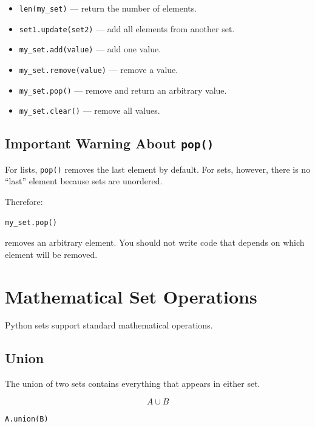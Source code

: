 \documentclass[11pt]{article}
\begin{document}
\begin{itemize}
    \item \verb|len(my_set)| --- return the number of elements.
    
    \item \verb|set1.update(set2)| --- add all elements from another set.
    
    \item \verb|my_set.add(value)| --- add one value.
    
    \item \verb|my_set.remove(value)| --- remove a value.
    
    \item \verb|my_set.pop()| --- remove and return an arbitrary value.
    
    \item \verb|my_set.clear()| --- remove all values.
\end{itemize}

\subsection{Important Warning About \texttt{pop()}}

For lists, \texttt{pop()} removes the last element by default. For sets, however, there is no ``last'' element because sets are unordered.

Therefore:

\begin{lstlisting}[language=Python]
my_set.pop()
\end{lstlisting}

removes an arbitrary element. You should not write code that depends on which element will be removed.

\section{Mathematical Set Operations}

Python sets support standard mathematical operations.

\subsection{Union}

The union of two sets contains everything that appears in either set.

\[
A \cup B
\]

\begin{lstlisting}[language=Python]
A.union(B)
\end{lstlisting}
\end{document}

